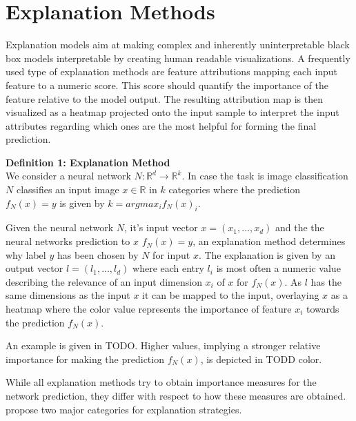 \section{Explanation Methods}
\label{sec:explanation_methods}


Explanation models aim at making complex and inherently uninterpretable black box models interpretable by creating human readable visualizations. 
A frequently used type of explanation methods are feature attributions mapping each input feature to a numeric score. This score should quantify the importance of the feature relative to the model output. The resulting attribution map is then visualized as a heatmap projected onto the input sample to interpret the input attributes regarding which ones are the most helpful for forming the final prediction. 

\textbf{Definition 1: Explanation Method}\\
We consider a neural network $N: \mathbb{R}^d \to \mathbb{R}^k$. In case the task is image classification $N$ classifies an input image $x\in  \mathbb{R}$ in $k$ categories where the prediction $f_N(x)=y$ is given by $k= arg max_i f_N(x)_i$.

Given the neural network $N$, it's input vector $x=(x_1, ..., x_d)$ and the the neural networks prediction to $x$ $f_N(x)=y$, an explanation method determines why label $y$ has been chosen by $N$ for input $x$. The explanation is given by an output vector $l=(l_1, ..., l_d)$ where each entry $l_i$ is most often a numeric value describing the relevance of an input dimension $x_i$ of $x$ for $f_N(x)$. 
As $l$ has the same dimensions as the input $x$ it can be mapped to the input, overlaying $x$ as a heatmap where the color value represents the importance of feature $x_i$ towards the prediction $f_N(x)$.

An example is given in TODO. Higher values, implying a stronger relative importance for making the prediction $f_N(x)$, is depicted in TODD color. 



While all explanation methods try to obtain importance measures for the network prediction, they differ with respect to how these measures are obtained. 
\cite{evaluating_explanations_security} propose two major categories for explanation strategies.\\

